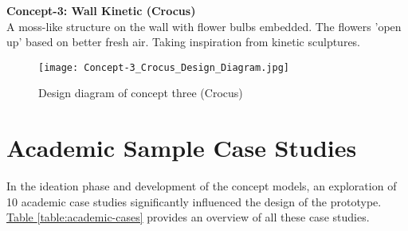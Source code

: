 \begin{appendices}
\newpage

\textbf{Concept-3: Wall Kinetic (Crocus)} \\
A moss-like structure on the wall with flower bulbs embedded. The flowers 'open up' based on better fresh air. Taking inspiration from kinetic sculptures.

\begin{figure}[H]
    \centering
    \texttt{[image: Concept-3\_Crocus\_Design\_Diagram.jpg]}
    \caption{Design diagram of concept three (Crocus)}
    \label{fig:concept-three}
\end{figure}

\section{Academic Sample Case Studies}
\label{appendix:academic}

In the ideation phase and development of the concept models, an exploration of 10 academic case studies significantly influenced the design of the prototype. \hyperref[table:academic-cases]{Table \ref{table:academic-cases}} provides an overview of all these case studies.


\end{appendices}
